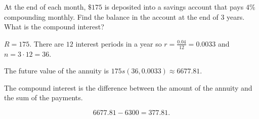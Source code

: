 \begin{example}
    At the end of each month, \(\$175\) is deposited into a savings account that pays \(4\%\) compounding monthly. Find the balance in the account at the end of \(3\) years. What is the compound interest?
    \begin{solution}
        \(R = 175.\) There are \(12\) interest periods in a year so \(r = \frac{0.04}{12} = 0.0033\) and \(n = 3 \cdot 12 = 36.\)

        The future value of the annuity is \(175s\left(36,0.0033\right) \approx 6677.81.\)

        The compound interest is the difference between the amount of the annuity and the sum of the payments.

        \[6677.81 - 6300 = 377.81.\]
    \end{solution}
\end{example}